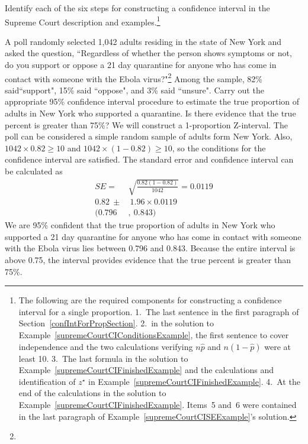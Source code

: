 \begin{exercise}
Identify each of the six steps for constructing a confidence interval in the Supreme Court description and examples.\footnote{The following are the required components for constructing a confidence interval for a single proportion. 1.~The last sentence in the first paragraph of Section~\ref{confIntForPropSection}. 2.~in the solution to Example~\ref{supremeCourtCIConditionsExample}, the first sentence to cover independence and the two calculations verifying $n\hat{p}$ and $n(1-\hat{p})$ were at least 10. 3.~The last formula in the solution to Example~\ref{supremeCourtCIFinishedExample} and the calculations and identification of $z^{\star}$ in Example~\ref{supremeCourtCIFinishedExample}. 4.~At the end of the calculations in the solution to Example~\ref{supremeCourtCIFinishedExample}. Items~5 and~6 were contained in the last paragraph of Example~\ref{supremeCourtCISEExample}'s solution.}
\end{exercise}

\begin{example}{A poll randomly selected 1,042 adults residing in the state of New York and asked the question, ``Regardless of whether the person shows symptoms or not, do you support or oppose a 21 day quarantine for anyone who has come in contact with someone with the Ebola virus?"\footnote{} Among the sample, 82\% said``support", 15\% said ``oppose", and 3\% said ``unsure". Carry out the appropriate 95\% confidence interval procedure to estimate the true proportion of adults in New York who supported a quarantine.  Is there evidence that the true percent is greater than 75\%?}
We will construct a 1-proportion Z-interval.  The poll can be considered a simple random sample of adults form New York.  Also, $1042\times 0.82\ge10$ and $1042\times (1-0.82)\ge10$, so the conditions for the confidence interval are satisfied. The standard error and confidence interval can be calculated as
\begin{align*}
SE=&\sqrt{\frac{0.82(1-0.82)}{1042}}=0.0119 \\
0.82\ \pm&\  1.96 \times 0.0119 \\
(0.796&,\ 0.843)
\end{align*}
We are 95\% confident that the true proportion of adults in New York who supported a 21 day quarantine for anyone who has come in contact with someone with the Ebola virus lies between 0.796 and 0.843.  Because the entire interval is above 0.75, the interval provides evidence that the true percent is greater than 75\%.
\end{example}

